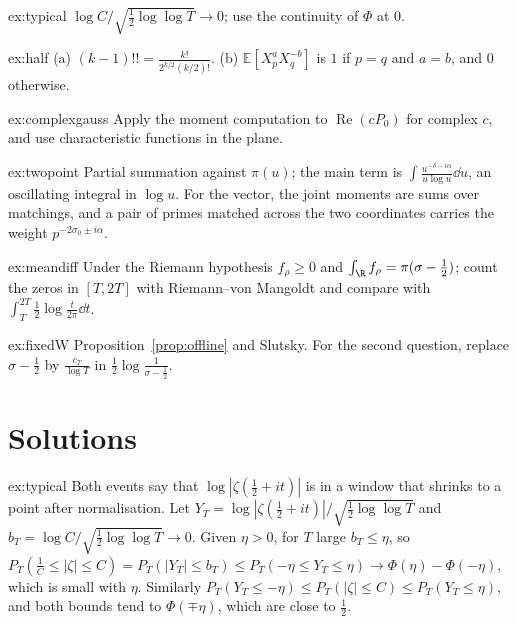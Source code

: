 \begin{hint}{ex:typical}
$\log C/\sqrt{\frac12\log\log T}\to0$; use the continuity of $\Phi$ at $0$.
\end{hint}
\begin{hint}{ex:half}
(a) $(k-1)!!=\frac{k!}{2^{k/2}(k/2)!}$. (b) $\mathbb E[X_p^aX_q^{-b}]$ is $1$ if $p=q$ and $a=b$, and $0$ otherwise.
\end{hint}
\begin{hint}{ex:complexgauss}
Apply the moment computation to $\operatorname{Re}(cP_0)$ for complex $c$, and use characteristic functions in the plane.
\end{hint}
\begin{hint}{ex:twopoint}
Partial summation against $\pi(u)$; the main term is $\int\frac{u^{-\delta-i\alpha}}{u\log u}\dd u$, an oscillating integral in $\log u$. For the vector, the joint moments are sums over matchings, and a pair of primes matched across the two coordinates carries the weight $p^{-2\sigma_0\pm i\alpha}$.
\end{hint}
\begin{hint}{ex:meandiff}
Under the Riemann hypothesis $f_\rho\ge0$ and $\int_\R f_\rho=\pi(\sigma-\frac12)$; count the zeros in $[T,2T]$ with Riemann--von Mangoldt and compare with $\int_T^{2T}\frac12\log\frac t{2\pi}\dd t$.
\end{hint}
\begin{hint}{ex:fixedW}
Proposition~\ref{prop:offline} and Slutsky. For the second question, replace $\sigma-\frac12$ by $\frac{c_T}{\log T}$ in $\frac12\log\frac1{\sigma-\frac12}$.
\end{hint}

\section{Solutions}

\begin{solution}{ex:typical}
\idea Both events say that $\log|\zeta(\frac12+it)|$ is in a window that shrinks to a point after normalisation.
\writeup Let $Y_T=\log|\zeta(\frac12+it)|/\sqrt{\frac12\log\log T}$ and $b_T=\log C/\sqrt{\frac12\log\log T}\to0$. Given $\eta>0$, for $T$ large $b_T\le\eta$, so $P_T(\frac1C\le|\zeta|\le C)=P_T(|Y_T|\le b_T)\le P_T(-\eta\le Y_T\le\eta)\to\Phi(\eta)-\Phi(-\eta)$, which is small with $\eta$. Similarly $P_T(Y_T\le-\eta)\le P_T(|\zeta|\le C)\le P_T(Y_T\le\eta)$, and both bounds tend to $\Phi(\mp\eta)$, which are close to $\frac12$.
\end{solution}

